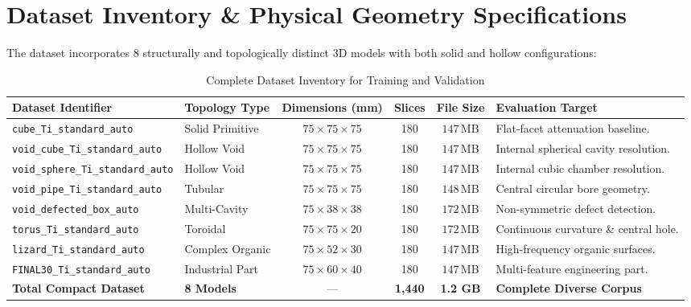 \documentclass[10pt,a4paper]{article}
\begin{document}
\vspace{6pt}
\section{Dataset Inventory \& Physical Geometry Specifications}

The dataset incorporates 8 structurally and topologically distinct 3D models with both solid and hollow configurations:

\begin{table}[h]
\centering
\small
\caption{Complete Dataset Inventory for Training and Validation}
\begin{tabularx}{\textwidth}{@{}l l c c c X@{}}
\toprule
\textbf{Dataset Identifier} & \textbf{Topology Type} & \textbf{Dimensions (mm)} & \textbf{Slices} & \textbf{File Size} & \textbf{Evaluation Target} \\ \midrule
\texttt{cube\_Ti\_standard\_auto} & Solid Primitive & $75 \times 75 \times 75$ & 180 & $147$\,MB & Flat-facet attenuation baseline. \\
\texttt{void\_cube\_Ti\_standard\_auto} & Hollow Void & $75 \times 75 \times 75$ & 180 & $147$\,MB & Internal spherical cavity resolution. \\
\texttt{void\_sphere\_Ti\_standard\_auto} & Hollow Void & $75 \times 75 \times 75$ & 180 & $147$\,MB & Internal cubic chamber resolution. \\
\texttt{void\_pipe\_Ti\_standard\_auto} & Tubular & $75 \times 75 \times 75$ & 180 & $148$\,MB & Central circular bore geometry. \\
\texttt{void\_defected\_box\_auto} & Multi-Cavity & $75 \times 38 \times 38$ & 180 & $172$\,MB & Non-symmetric defect detection. \\
\texttt{torus\_Ti\_standard\_auto} & Toroidal & $75 \times 75 \times 20$ & 180 & $172$\,MB & Continuous curvature \& central hole. \\
\texttt{lizard\_Ti\_standard\_auto} & Complex Organic & $75 \times 52 \times 30$ & 180 & $147$\,MB & High-frequency organic surfaces. \\
\texttt{FINAL30\_Ti\_standard\_auto} & Industrial Part & $75 \times 60 \times 40$ & 180 & $147$\,MB & Multi-feature engineering part. \\ \midrule
\textbf{Total Compact Dataset} & \textbf{8 Models} & --- & \textbf{1,440} & \textbf{1.2 GB} & \textbf{Complete Diverse Corpus} \\ \bottomrule
\end{tabularx}
\end{table}
\end{document}
